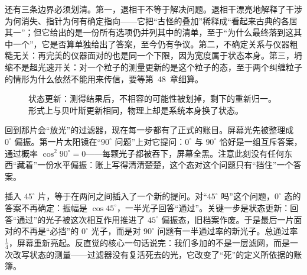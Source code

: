 还有三条边界必须划清。第一，退相干不等于解决问题。退相干漂亮地解释了干涉为何消失、指针为何有确定指向——它把“古怪的叠加”稀释成“看起来古典的各居其一”；但它给出的是一份所有选项仍并列其中的清单，至于“为什么最终落到这其中一个”，它是否算单独给出了答案，至今仍有争议。第二，不确定关系与仪器粗糙无关：再完美的仪器面对的也是同一个下限，因为宽度属于状态本身。第三，坍缩不是超光速开关：对一个粒子的测量更新的是这个粒子的态，至于两个纠缠粒子的情形为什么依然不能用来传信，要等第~48~章细算。

\begin{figure}[htbp]
\centering
{}
\caption{状态更新：测得结果后，不相容的可能性被划掉，剩下的重新归一。形式上与贝叶斯更新相同，物理上却是系统本身换了状态。}
\end{figure}


回到那片会“放光”的过滤器，现在每一步都有了正式的账目。屏幕光先被整理成 $0^\circ$ 偏振。第一片太阳镜在“$90^\circ$ 问题”上对它提问：$0^\circ$ 与 $90^\circ$ 恰好是一组互斥答案，通过概率 $\cos^2 90^\circ=0$——每颗光子都被吞下，屏幕全黑。注意此刻没有任何东西“藏着”一份水平偏振：账上写得清清楚楚，这个态对这个问题只有“挡住”一个答案。

插入 $45^\circ$ 片，等于在两问之间插入了一个新的提问。对“$45^\circ$ 吗”这个问题，$0^\circ$ 态的答案不再确定：振幅是 $\cos 45^\circ$，一半光子回答“通过”。关键一步是状态更新：回答“通过”的光子被这次相互作用推进了 $45^\circ$ 偏振态，旧档案作废。于是最后一片面对的不再是“必挡”的 $0^\circ$ 光子，而是对 $90^\circ$ 问题有一半通过率的新光子。总通过率 $\tfrac14$，屏幕重新亮起。反直觉的核心一句话说完：我们多加的不是一层滤网，而是一次改写状态的测量——过滤器没有复活死去的光，它改变了“死”的定义所依据的账簿。

